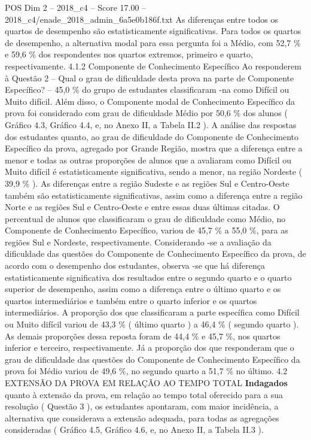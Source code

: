 \begin{textsample}{POS Dim 2 – 2018\_c4 – Score 17.00 – 2018\_c4/enade\_2018\_admin\_6a5e0b186f.txt}
As diferenças entre todos os quartos de desempenho são estatisticamente significativas.
Para todos os quartos de desempenho, a alternativa modal para essa pergunta foi a Médio, com 52,7 \% e 59,6 \% dos respondentes nos quartos extremos, primeiro e quarto, respectivamente. 4.1.2 Componente de Conhecimento Específico Ao responderem à Questão 2 – Qual o grau de dificuldade desta prova na parte de Componente Específico? – 45,0 \% do grupo de estudantes classificaram -na como Difícil ou Muito difícil.
Além disso, o Componente modal de Conhecimento Específico da prova foi considerado com grau de dificuldade Médio por 50,6 \% dos alunos ( Gráfico 4.3, Gráfico 4.4, e, no Anexo II, a Tabela II.2 ).
A análise das respostas dos estudantes quanto, ao grau de dificuldade do Componente de Conhecimento Específico da prova, agregado por Grande Região, mostra que a diferença entre a menor e todas as outras proporções de alunos que a avaliaram como Difícil ou Muito difícil é estatisticamente significativa, sendo a menor, na região Nordeste ( 39,9 \% ).
As diferenças entre a região Sudeste e as regiões Sul e Centro-Oeste também são estatisticamente significativas, assim como a diferença entre a região Norte e as regiões Sul e Centro-Oeste e entre essas duas últimas citadas.
O percentual de alunos que classificaram o grau de dificuldade como Médio, no Componente de Conhecimento Específico, variou de 45,7 \% a 55,0 \%, para as regiões Sul e Nordeste, respectivamente.
Considerando -se a avaliação da dificuldade das questões do Componente de Conhecimento Específico da prova, de acordo com o desempenho dos estudantes, observa -se que há diferença estatisticamente significativa dos resultados entre o segundo quarto e o quarto superior de desempenho, assim como a diferença entre o último quarto e os quartos intermediários e também entre o quarto inferior e os quartos intermediários.
A proporção dos que classificaram a parte específica como Difícil ou Muito difícil variou de 43,3 \% ( último quarto ) a 46,4 \% ( segundo quarto ).
As demais proporções dessa reposta foram de 44,4 \% e 45,7 \%, nos quartos inferior e terceiro, respectivamente.
Já a proporção dos que responderam que o grau de dificuldade das questões do Componente de Conhecimento Específico da prova foi Médio variou de 49,6 \%, no segundo quarto a 51,7 \% no último. 4.2 EXTENSÃO DA PROVA EM RELAÇÃO AO TEMPO TOTAL \textbf{Indagados} quanto à extensão da prova, em relação ao tempo total oferecido para a sua resolução ( Questão 3 ), os estudantes apontaram, com maior incidência, a alternativa que considerava a extensão adequada, para todas as agregações consideradas ( Gráfico 4.5, Gráfico 4.6, e, no Anexo II, a Tabela II.3 ).

\end{textsample}
